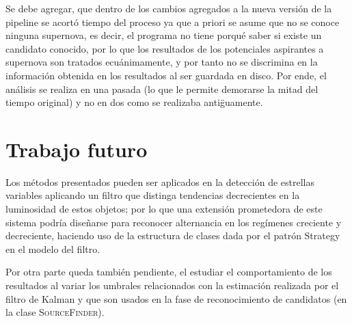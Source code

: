 Se debe agregar, que dentro de los cambios agregados a la nueva versi\'on de la pipeline se acort\'o tiempo del proceso ya que a priori se asume que no se conoce ninguna supernova, es decir, el programa no tiene porqu\'e saber si existe un candidato conocido, por lo que los resultados de los potenciales aspirantes a supernova son tratados ecu\'animamente, y por tanto no se discrimina en la informaci\'on obtenida en los resultados al ser guardada en disco. Por ende, el an\'alisis se realiza en una pasada (lo que le permite demorarse la mitad del tiempo original) y no en dos como se realizaba anti\"guamente.
\bigskip


\section{Trabajo futuro}
Los m\'etodos presentados pueden ser aplicados en la detecci\'on de estrellas variables aplicando un filtro que distinga tendencias decrecientes en la luminosidad de estos objetos; por lo que una extensi\'on prometedora de este sistema podr\'ia dise\~narse  para reconocer alternancia en los reg\'imenes creciente y decreciente, haciendo uso de la estructura de clases dada por el patr\'on Strategy en el modelo del filtro.
\bigskip

Por otra parte queda tambi\'en pendiente, el estudiar el comportamiento de los resultados al variar los umbrales relacionados con la estimaci\'on realizada por el filtro de Kalman y que son usados en la fase de reconocimiento de candidatos (en la clase \textsc{SourceFinder}).
